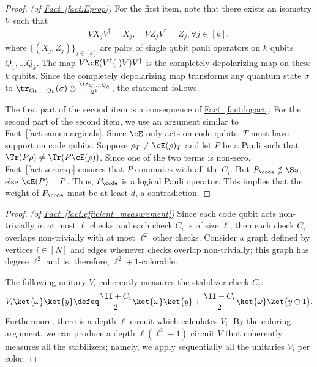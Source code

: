 \documentclass[11pt]{article}
\newcommand{\expref}[2]{\texorpdfstring{\hyperref[#2]{#1~\ref{#2}}}{#1~\ref{#2}}}
\begin{document}
\begin{proof}\textit{(of \expref{Fact}{fact:Eprop})}
For the first item, note that there exists an isometry $V$ such that
\begin{align}
V\overline{X_j} V^{\dagger} = X_j, \quad V\overline{Z_j} V^{\dagger} = Z_j, \forall j\in [k],
\end{align}
where $\{(X_j,Z_j)\}_{j\in [k]}$ are pairs of single qubit pauli operators on $k$ qubits $Q_1,\ldots Q_k$. The map 
$V\cE(V^{\dagger}(.)V)V^{\dagger}$ is the completely depolarizing map on these $k$ qubits. Since the completely depolarizing map transforms any quantum state $\sigma$ to $\tr_{Q_1,\ldots Q_k}(\sigma)\otimes \frac{\id_{Q_,\ldots Q_k}}{2^k}$, the statement follows.

The first part of the second item is a consequence of \expref{Fact}{fact:logact}. For the second part of the second item, we use an argument similar to \expref{Fact}{fact:samemarginals}. Since $\cE$ only acts on code qubits, $T$ must have support on code qubits. Suppose $\rho_T\neq \cE(\rho)_T$ and let $P$ be a Pauli such that $\Tr(P\rho)\neq \Tr(P\cE(\rho))$. Since one of the two terms is non-zero, \expref{Fact}{fact:zeroexp} ensures that $P$ commutes with all the $C_i$. But $P_{\code}\notin \Ss$, else $\cE(P)=P$. Thus, $P_{\code}$ is a logical Pauli operator. This implies that the weight of $P_{\code}$ must be at least $d$, a contradiction. 
\end{proof}

\begin{proof}\textit{(of \expref{Fact}{fact:efficient_measurement})}
Since each code qubit acts non-trivially in at most $\ell$ checks and each check $C_i$ is of size $\ell$, then each check $C_i$ overlaps non-trivially with at most $\ell^2$ other checks. Consider a graph defined by vertices $i \in [N]$ and edges whenever checks overlap non-trivially; this graph has degree $\ell^2$ and is, therefore, $\ell^2 + 1$-colorable. 

The following unitary $V_i$ coherently measures the stabilizer check $C_i$:
\begin{align}
    V_i \ket{\omega} \ket{y} \defeq \frac{\II + C_i}{2} \ket{\omega}\ket{y} + \frac{\II - C_i}{2} \ket{\omega}\ket{y \oplus 1}.
\end{align}
Furthermore, there is a depth $\ell$ circuit which calculates $V_i$. By the coloring argument, we can produce a depth $\ell(\ell^2 + 1)$ circuit $V$ that coherently measures all the stabilizers; namely, we apply sequentially all the unitaries $V_i$ per color.
\end{proof}
\end{document}
